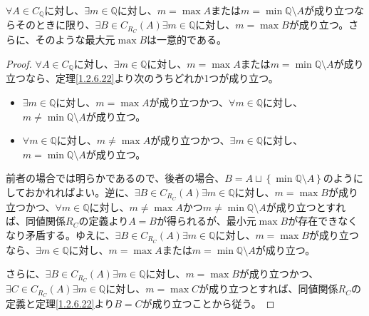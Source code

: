 \documentclass[dvipdfmx]{jsarticle}
\begin{document}
\begin{thm}\label{1.2.6.25}
$\forall A \in C_{\mathbb{Q}}$に対し、$\exists m \in \mathbb{Q}$に対し、$m = \max A$または$m = \min{\mathbb{Q} \setminus A}$が成り立つならそのときに限り、$\exists B \in C_{R_{C}}(A)\exists m \in \mathbb{Q}$に対し、$m = \max B$が成り立つ。さらに、そのような最大元$\max B$は一意的である。
\end{thm}
\begin{proof}
$\forall A \in C_{\mathbb{Q}}$に対し、$\exists m \in \mathbb{Q}$に対し、$m = \max A$または$m = \min{\mathbb{Q} \setminus A}$が成り立つなら、定理\ref{1.2.6.22}より次のうちどれか1つが成り立つ。
\begin{itemize}
\item
  $\exists m \in \mathbb{Q}$に対し、$m = \max A$が成り立つかつ、$\forall m \in \mathbb{Q}$に対し、$m \neq \min{\mathbb{Q} \setminus A}$が成り立つ。
\item
  $\forall m \in \mathbb{Q}$に対し、$m \neq \max A$が成り立つかつ、$\exists m \in \mathbb{Q}$に対し、$m = \min{\mathbb{Q} \setminus A}$が成り立つ。
\end{itemize}
前者の場合では明らかであるので、後者の場合、$B = A \sqcup \left\{ \min{\mathbb{Q} \setminus A} \right\}$のようにしておかれればよい。逆に、$\exists B \in C_{R_{C}}(A)\exists m \in \mathbb{Q}$に対し、$m = \max B$が成り立つかつ、$\forall m \in \mathbb{Q}$に対し、$m \neq \max A$かつ$m \neq \min{\mathbb{Q} \setminus A}$が成り立つとすれば、同値関係$R_{C}$の定義より$A = B$が得られるが、最小元$\max B$が存在できなくなり矛盾する。ゆえに、$\exists B \in C_{R_{C}}(A)\exists m \in \mathbb{Q}$に対し、$m = \max B$が成り立つなら、$\exists m \in \mathbb{Q}$に対し、$m = \max A$または$m = \min{\mathbb{Q} \setminus A}$が成り立つ。\par
さらに、$\exists B \in C_{R_{C}}(A)\exists m \in \mathbb{Q}$に対し、$m = \max B$が成り立つかつ、$\exists C \in C_{R_{C}}(A)\exists m \in \mathbb{Q}$に対し、$m = \max C$が成り立つとすれば、同値関係$R_{C}$の定義と定理\ref{1.2.6.22}より$B = C$が成り立つことから従う。
\end{proof}
\end{document}
